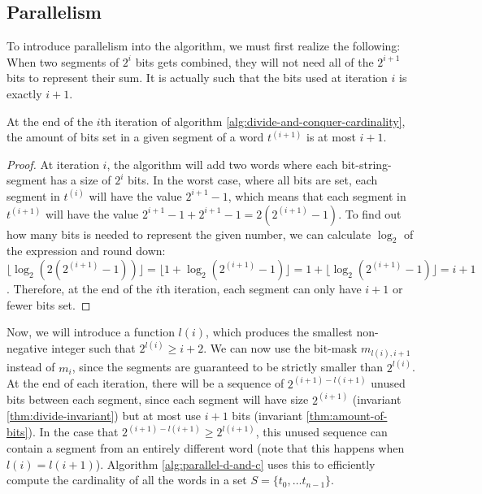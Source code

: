 \subsection{Parallelism}
To introduce parallelism into the algorithm, we must first realize the following: When two segments of $2^i$ bits gets combined, they will not need all of the $2^{i+1}$ bits to represent their sum. It is actually such that the bits used at iteration $i$ is exactly $i+1$.
\begin{invariant}
    \label{thm:amount-of-bits}
    At the end of the $i$th iteration of algorithm \ref{alg:divide-and-conquer-cardinality}, the amount of bits set in a given segment of a word $t^{(i+1)}$ is at most $i+1$.
\end{invariant}
\begin{proof}
    At iteration $i$, the algorithm will add two words where each bit-string-segment has a size of $2^i$ bits. In the worst case, where all bits are set, each segment in $t^{(i)}$ will have the value $2^{i+1}-1$, which means that each segment in $t^{(i+1)}$ will have the value $2^{i+1}-1 + 2^{i+1}-1 = 2(2^{(i+1)} - 1)$. To find out how many bits is needed to represent the given number, we can calculate $\log_2$ of the expression and round down: $\lfloor \log_2{(2(2^{(i+1)} - 1))}\rfloor=\lfloor 1 + \log_2{(2^{(i+1)}-1)} \rfloor = 1+\lfloor \log_2{(2^{(i+1)}-1)}\rfloor = i + 1$. Therefore, at the end of the $i$th iteration, each segment can only have $i+1$ or fewer bits set.
\end{proof}
Now, we will introduce a function $l(i)$, which produces the smallest non-negative integer such that $2^{l(i)} \geq i + 2$. We can now use the bit-mask $m_{l(i), i+1}$ instead of $m_{i}$, since the segments are guaranteed to be strictly smaller than $2^{l(i)}$. At the end of each iteration, there will be a sequence of $2^{(i+1)-l(i+1)}$ unused bits between each segment, since each segment will have size $2^{(i+1)}$ (invariant \ref{thm:divide-invariant}) but at most use $i+1$ bits (invariant \ref{thm:amount-of-bits}). In the case that $2^{(i+1) - l(i+1)} \geq 2^{l(i+1)}$, this unused sequence can contain a segment from an entirely different word (note that this happens when $l(i)=l(i+1)$). Algorithm \ref{alg:parallel-d-and-c} uses this to efficiently compute the cardinality of all the words in a set $S = \{t_0, \dots t_{n-1}\}$.
